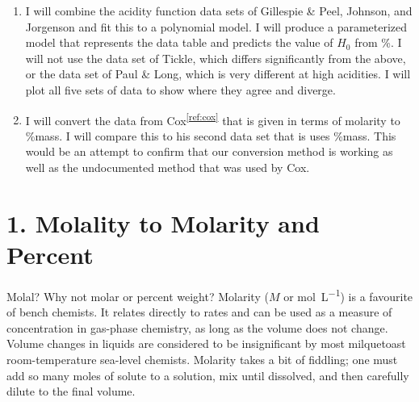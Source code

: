 \documentclass[]{tufte-handout}
\newcommand{\tss}[1]{\textsuperscript{#1}}
\begin{document}
\begin{enumerate}
\item I will combine the acidity function data sets of Gillespie \& Peel, Johnson, and Jorgenson and fit this to a polynomial model. I will produce a parameterized model that represents the data table and predicts the value of $H_0$ from \%. I will not use the data set of Tickle, which differs significantly from the above, or the data set of Paul \& Long, which is very different at high acidities. I will plot all five sets of data to show where they agree and diverge. 

\item I will convert the data from Cox\tss{\ref{ref:cox}} that is given in terms of molarity to \%mass. I will compare this to his second data set that is uses \%mass. This would be an attempt to confirm that our conversion method is working as well as the undocumented method that was used by Cox. 

\end{enumerate}

 


\section{1. Molality to Molarity and Percent}\label{sec:one}

Molal? Why not molar or percent weight? Molarity ($M$ or \unit{\mole\per\liter}) is a favourite of bench chemists. It relates directly to rates and can be used as a measure of concentration in gas-phase chemistry, as long as the volume does not change. Volume changes in liquids are considered to be insignificant by most milquetoast room-temperature sea-level chemists. Molarity takes a bit of fiddling; one must add so many moles of solute to a solution, mix until dissolved, and then carefully dilute to the final volume.
\end{document}
